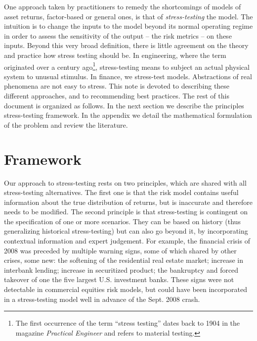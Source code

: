\documentclass[letter, 12pt]{article}
\begin{document}
One approach taken by practitioners to remedy the shortcomings of models of asset returns, factor-based or general ones, is that of \emph{stress-testing} the model. The intuition is to change the inputs to the model beyond its normal operating regime in order to assess the sensitivity of the output -- the risk metrics -- on these inputs. Beyond this very broad definition, there is little agreement on the theory and practice how stress testing should be. In engineering, where the term originated over a century ago\footnote{The first occurrence of the term ``stress testing'' dates back to 1904 in the magazine \emph{Practical Engineer} and refers to material testing.}, stress-testing means to subject an actual physical system to unusual stimulus. In finance, we stress-test models. Abstractions of real phenomena are not easy to stress. This note is devoted to describing these different approaches, and to recommending best practices. The rest of this document is organized as follows. In the next section we describe the principles stress-testing framework. In the appendix we detail the mathematical formulation of the problem and review the literature.
\section{Framework}
Our approach to stress-testing rests on two principles, which are shared with all stress-testing alternatives. The first one is that the risk model contains useful information about the true distribution of returns, but is inaccurate and therefore needs to be modified. The second principle is that stress-testing is contingent on the specification of one or more scenarios. They can be based on history (thus generalizing historical stress-testing) but can also go beyond it, by incorporating contextual information and expert judgement. For example,  the financial crisis of 2008 was preceded by multiple warning signs, some of which shared by other crises, some new: the softening of the residential real estate market; increase in interbank lending; increase in securitized product; the bankruptcy and forced takeover of one the five largest U.S. investment banks. These signs were not detectable in commercial equities risk models, but could have been incorporated in a stress-testing model well in advance of the Sept. 2008 crash. 
\end{document}
